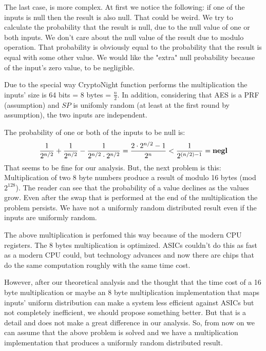 The last case, is more complex. At first we notice the following: if one of the inputs is null then the result is also null. That could be weird. We try to calculate the probability that the result is null, due to the null value of one or both inputs. We don't care about the null value of the result due to modulo operation. That probability is obviously equal to the probability that the result is equal with some other value. We would like the "extra" null probability because of the input's zero value, to be negligible.

Due to the special way CryptoNight function performs the multiplication the inputs' size is 64 bits = 8 bytes = $\frac{n}{2}$. In addition, considering that AES is a PRF (assumption) and $SP$ is unifomly random (at least at the first round by assumption), the two inputs are independent.

\noindent The probability of one or both of the inputs to be null is:
\begin{equation} \label{prob_zero}
  \frac{1}{2^{n/2}} + \frac{1}{2^{n/2}} - \frac{1}{2^{n/2} \cdot 2^{n/2}} = \frac{2\cdot2^{n/2}-1}{2^n} < \frac{1}{2^{(n/2)-1}} = \mbox{\textbf{negl}}
\end{equation}
That seems to be fine for our analysis. But, the next problem is this: Multiplication of two 8 byte numbers produce a result of modulo 16 bytes (mod $2^{128}$). The reader can see that the probability of a value declines as the values grow. Even after the swap that is performed at the end of the multiplication the problem persists. We have not a uniformly random distributed result even if the inputs are uniformly random.

The above multiplication is perfomed this way because of the modern CPU registers. The 8 bytes multiplication is optimized. ASICs couldn't do this as fast as a modern CPU could, but technology advances and now there are chips that do the same computation roughly with the same time cost.

However, after our theoretical analysis and the thought that the time cost of a 16 byte multiplication or maybe an 8 byte multiplication implementation that maps inputs' uniform distribution can make a system less efficient against ASICs but not completely inefficient, we should propose something better. But that is a detail and does not make a great difference in our analysis. So, from now on we can assume that the above problem is solved and we have a multiplication implementation that produces a uniformly random distributed result.

